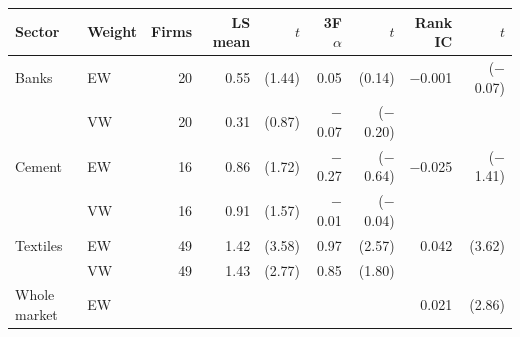 \begin{tabular}{llrrrrrrr}
\toprule
Sector & Weight & Firms & LS mean & $t$ & 3F $\alpha$ & $t$ & Rank IC & $t$ \\
\midrule
Banks & EW & 20 & 0.55 & (1.44) & 0.05 & (0.14) & \ensuremath{-}0.001 & (\ensuremath{-}0.07) \\
 & VW & 20 & 0.31 & (0.87) & \ensuremath{-}0.07 & (\ensuremath{-}0.20) &  &  \\
Cement & EW & 16 & 0.86 & (1.72) & \ensuremath{-}0.27 & (\ensuremath{-}0.64) & \ensuremath{-}0.025 & (\ensuremath{-}1.41) \\
 & VW & 16 & 0.91 & (1.57) & \ensuremath{-}0.01 & (\ensuremath{-}0.04) &  &  \\
Textiles & EW & 49 & 1.42 & (3.58) & 0.97 & (2.57) & 0.042 & (3.62) \\
 & VW & 49 & 1.43 & (2.77) & 0.85 & (1.80) &  &  \\
\midrule
Whole market & EW & & & & & & 0.021 & (2.86) \\
\bottomrule
\end{tabular}
